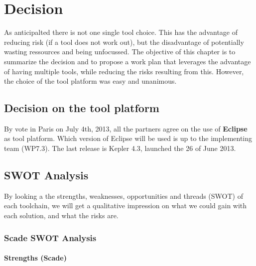 
\newcommand{\decision}[1]{
\begin{center}
\begin{tabular}{ p{13cm} }
\stepcounter{decision}\textbf{Decision~\arabic{decision}}  \\
\hline
\multicolumn{1}{|p{13cm}|}{#1} \\
\hline
\end{tabular}
\end{center}
}


\chapter{Decision}
\label{sec:decision}

As anticipalted there is not one single tool choice. This has the advantage of reducing risk (if a tool does not work out), but the disadvantage of potentially wasting ressources and being unfocussed.  The objective of this chapter is to summarize the decision and to propose a work plan that leverages the advantage of having multiple tools, while reducing the risks resulting from this.  However, the choice of the tool platform was easy and unanimous.

\section{Decision on the tool platform}

By vote in Paris on July 4th, 2013, all the partners agree on the use of \textbf{Eclipse} as tool platform.  Which version of Eclipse will be used is up to the implementing team (WP7.3).  The last release is Kepler 4.3, launched the 26 of June 2013.

\section{SWOT Analysis}

By looking a the strengths, weaknesses, opportunities and threads (SWOT) of each toolchain, we will get a qualitative impression on what we could gain with each solution, and what the risks are.

\subsection{Scade SWOT Analysis}

\subsubsection{Strengths (Scade)}

